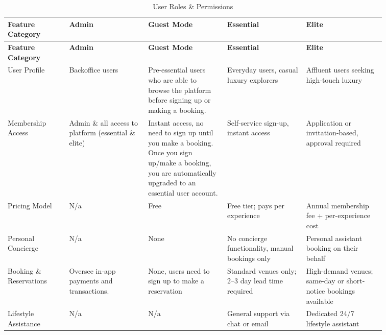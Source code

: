 \begingroup
\setlength{\LTleft}{0pt}
\setlength{\LTright}{\fill}
\setlength{\LTcapwidth}{\linewidth}
\setlength{\tabcolsep}{4pt}
\footnotesize
\renewcommand{\arraystretch}{1.4}
\captionsetup{justification=raggedright,singlelinecheck=false}
\begin{longtable}{|>{\centering\arraybackslash}p{0.14\linewidth}|>{\centering\arraybackslash}p{0.18\linewidth}|>{\centering\arraybackslash}p{0.18\linewidth}|>{\centering\arraybackslash}p{0.18\linewidth}|>{\centering\arraybackslash}p{0.18\linewidth}|}
\caption{User Roles \& Permissions}
\label{tab:user-roles} \\
\hline
\textbf{Feature Category} & \textbf{Admin} & \textbf{Guest Mode} & \textbf{Essential} & \textbf{Elite} \\
\hline
\endfirsthead
\hline
\textbf{Feature Category} & \textbf{Admin} & \textbf{Guest Mode} & \textbf{Essential} & \textbf{Elite} \\
\hline
\endhead
\hline
\endfoot

User Profile
  & Backoffice users
  & Pre-essential users who are able to browse the platform before signing up or making a booking.
  & Everyday users, casual luxury explorers
  & Affluent users seeking high-touch luxury \\
\hline

Membership Access
  & Admin \& all access to platform (essential \& elite)
  & Instant access, no need to sign up until you make a booking. Once you sign up/make a booking, you are automatically upgraded to an essential user account.
  & Self-service sign-up, instant access
  & Application or invitation-based, approval required \\
\hline

Pricing Model
  & N/a
  & Free
  & Free tier; pays per experience
  & Annual membership fee + per-experience cost \\
\hline

Personal Concierge
  & N/a
  & None
  & No concierge functionality, manual bookings only
  & Personal assistant booking on their behalf \\
\hline

Booking \& Reservations
  & Oversee in-app payments and transactions.
  & None, users need to sign up to make a reservation
  & Standard venues only; 2--3 day lead time required
  & High-demand venues; same-day or short-notice bookings available \\
\hline

Lifestyle Assistance
  & N/a
  & N/a
  & General support via chat or email
  & Dedicated 24/7 lifestyle assistant \\
\hline


\end{longtable}
